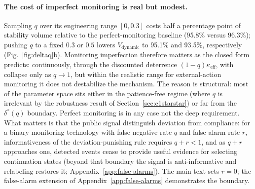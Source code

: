 \documentclass[manuscript,screen,review]{jair}
\newcommand{\VdynOverall}{95.8\%}      %
\newcommand{\VdynQzero}{96.3\%}        %
\newcommand{\VdynQhalf}{93.5\%}        %
\newcommand{\VdynQthree}{95.1\%}       %
\begin{document}
\paragraph{The cost of imperfect monitoring is real but modest.}
Sampling $q$ over its engineering range $[0,0.3]$ costs half a percentage point of stability volume relative to the perfect-monitoring baseline (\VdynOverall{} versus \VdynQzero{}); pushing $q$ to a fixed $0.3$ or $0.5$ lowers $V_{\mathrm{dynamic}}$ to \VdynQthree{} and \VdynQhalf{}, respectively (Fig.~\ref{fig:deltaq}b). Monitoring imperfection therefore matters as the closed form predicts: continuously, through the discounted deterrence $(1-q)\kappa_{\mathrm{eff}}$, with collapse only as $q \to 1$, but within the realistic range for external-action monitoring it does not destabilize the mechanism. The reason is structural: most of the parameter space sits either in the patience-free regime (where $q$ is irrelevant by the robustness result of Section~\ref{sec:c1starstar}) or far from the $\delta^*(q)$ boundary. Perfect monitoring is in any case not the deep requirement. What matters is that the public signal distinguish deviation from compliance: for a binary monitoring technology with false-negative rate $q$ and false-alarm rate $r$, informativeness of the deviation-punishing rule requires $q + r < 1$, and as $q + r$ approaches one, detected events cease to provide useful evidence for selecting continuation states (beyond that boundary the signal is anti-informative and relabeling restores it; Appendix~\ref{app:false-alarms}). The main text sets $r = 0$; the false-alarm extension of Appendix~\ref{app:false-alarms} demonstrates the boundary.
\end{document}
